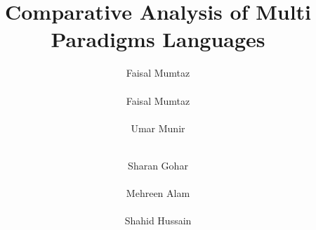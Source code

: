 \documentclass{sig-alternate}
\begin{document}
%

\title{Comparative Analysis of Multi Paradigms Languages}

%
%
%
%
%

%
\author{
%
%
\alignauthor
Faisal Mumtaz\\
       \\
\alignauthor
Faisal Mumtaz\\
\\
\alignauthor Umar Munir\\
\\
\and  %
\alignauthor Sharan Gohar \\
\\
\alignauthor Mehreen Alam\\
\\
\alignauthor Shahid Hussain\\
\\
}
\end{document}
